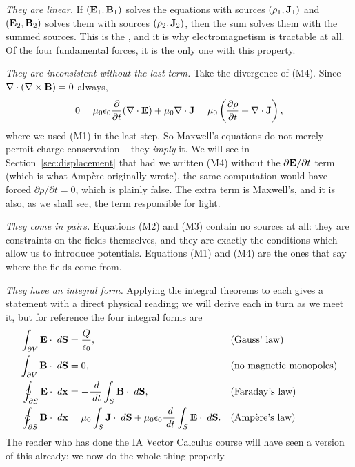 \documentclass[a4paper]{scrartcl}
\begin{document}
\emph{They are linear.} If $(\mathbf{E}_1, \mathbf{B}_1)$ solves the equations with sources $(\rho_1, \mathbf{J}_1)$ and $(\mathbf{E}_2, \mathbf{B}_2)$ solves them with sources $(\rho_2, \mathbf{J}_2)$, then the sum solves them with the summed sources. This is the , and it is why electromagnetism is tractable at all. Of the four fundamental forces, it is the only one with this property.

\emph{They are inconsistent without the last term.} Take the divergence of (M4). Since $\nabla \cdot (\nabla \times \mathbf{B}) = 0$ always,
$$
0 = \mu_0 \epsilon_0 \frac{\partial}{\partial t}(\nabla \cdot \mathbf{E}) + \mu_0 \nabla \cdot \mathbf{J} = \mu_0\left(\frac{\partial \rho}{\partial t} + \nabla \cdot \mathbf{J}\right),
$$
where we used (M1) in the last step. So Maxwell's equations do not merely permit charge conservation -- they \emph{imply} it. We will see in Section~\ref{sec:displacement} that had we written (M4) without the $\partial \mathbf{E}/\partial t$ term (which is what Amp\`ere originally wrote), the same computation would have forced $\partial \rho/\partial t = 0$, which is plainly false. The extra term is Maxwell's, and it is also, as we shall see, the term responsible for light.

\emph{They come in pairs.} Equations (M2) and (M3) contain no sources at all: they are constraints on the fields themselves, and they are exactly the conditions which allow us to introduce potentials. Equations (M1) and (M4) are the ones that say where the fields come from.

\emph{They have an integral form.} Applying the integral theorems to each gives a statement with a direct physical reading; we will derive each in turn as we meet it, but for reference the four integral forms are
\begin{align*}
	\int_{\partial V} \mathbf{E}\cdot \; d \mathbf{S} &= \frac{Q}{\epsilon_0}, & &\text{(Gauss' law)}\\
	\int_{\partial V} \mathbf{B}\cdot \; d \mathbf{S} &= 0, & &\text{(no magnetic monopoles)}\\
	\oint_{\partial S} \mathbf{E} \cdot \; d \mathbf{x} &= -\frac{\; d}{\; d t}\int_S \mathbf{B}\cdot \; d \mathbf{S}, & &\text{(Faraday's law)}\\
	\oint_{\partial S} \mathbf{B} \cdot \; d \mathbf{x} &= \mu_0 \int_S \mathbf{J}\cdot \; d \mathbf{S} + \mu_0\epsilon_0 \frac{\; d}{\; d t}\int_S \mathbf{E}\cdot \; d \mathbf{S}. & &\text{(Amp\`ere's law)}
\end{align*}
The reader who has done the IA Vector Calculus course will have seen a version of this already; we now do the whole thing properly.
\end{document}

